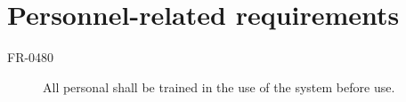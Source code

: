  \section{Personnel-related requirements}
 \begin{description}
 \item[FR-0480] All personal shall be trained in the use of the system before use. 
 \end{description}